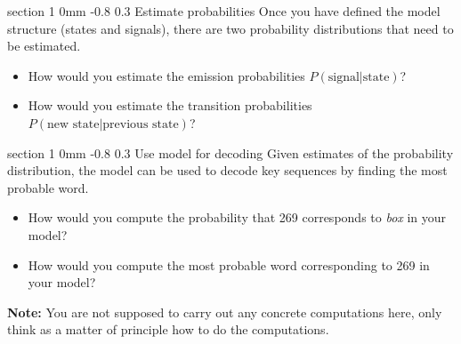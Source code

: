 \documentclass[11pt]{article}
\makeatletter
\newcommand{\newsec}[2]{\section{#1}\label{sec:#2}\noindent}
\renewcommand{\section}{\@startsection
{section}%
{1}%
{0mm}%
{-0.8\baselineskip}%
{0.3\baselineskip}%
{\bfseries\large}}%
\makeatother
\begin{document}
\newsec{Estimate probabilities}{estimate}%
Once you have defined the model structure (states and signals), there
are two probability distributions that need to be estimated.
\begin{itemize}[noitemsep,topsep=0.2cm]
\item How would you estimate the emission probabilities
  $P(\mbox{signal}|\mbox{state})$?
\item How would you estimate the transition probabilities
  $P(\mbox{new state}|\mbox{previous state})$?
\end{itemize}

\newsec{Use model for decoding}{decode}%
Given estimates of the probability distribution, the model can be used
to decode key sequences by finding the most probable word.
\begin{itemize}[noitemsep,topsep=0.2cm]
\item How would you compute the probability that 269 corresponds to
  {\em box} in your model?
\item How would you compute the most probable word corresponding to
  269 in your model?
\end{itemize}
\textbf{Note:} You are not supposed to carry out any concrete
computations here, only think as a matter of principle how to do the
computations.

\end{document}

